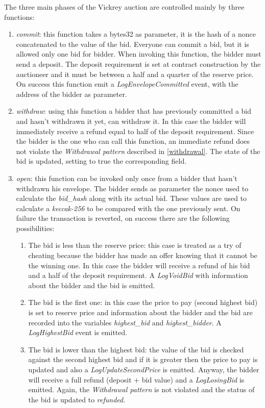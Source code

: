 \documentclass{article}
\begin{document}
The three main phases of the Vickrey auction are controlled mainly by three functions:
\begin{enumerate}
    \item \textit{commit}: this function takes a bytes32 as parameter, it is the hash of a nonce concatenated to the value of the bid. Everyone can commit a bid, but it is allowed only one bid for bidder. When invoking this function, the bidder must send a deposit. The deposit requirement is set at contract construction by the auctioneer and it must be between a half and a quarter of the reserve price. On success this function emit a \textit{LogEnvelopeCommitted} event, with the address of the bidder as parameter.
    \item \textit{withdraw}: using this function a bidder that has previously committed a bid and hasn't withdrawn it yet, can withdraw it. In this case the bidder will immediately receive a refund equal to half of the deposit requirement. Since the bidder is the one who can call this function, an immediate refund does not violate the \textit{Withdrawal pattern} described in \ref{withdrawal}. The state of the bid is updated, setting to true the corresponding field.
    \item \textit{open}: this function can be invoked only once from a bidder that hasn't withdrawn his envelope. The bidder sends as parameter the nonce used to calculate the \textit{bid\_hash} along with its actual bid. These values are used to calculate a \textit{keccak-256} to be compared with the one previously sent. On failure the transaction is reverted, on success there are the following possibilities:
    \begin{enumerate}
        \item The bid is less than the reserve price: this case is treated as a try of cheating because the bidder has made an offer knowing that it cannot be the winning one. In this case the bidder will receive a refund of his bid and a half of the deposit requirement. A \textit{LogVoidBid} with information about the bidder and the bid is emitted.
        \item The bid is the first one: in this case the price to pay (second highest bid) is set to reserve price and information about the bidder and the bid are recorded into the variables \textit{highest\_bid} and \textit{highest\_bidder}. A \textit{LogHighestBid} event is emitted.
        \item The bid is lower than the highest bid: the value of the bid is checked against the second highest bid and if it is greater then the price to pay is updated and also a \textit{LogUpdateSecondPrice} is emitted. Anyway, the bidder will receive a full refund (deposit + bid value) and a \textit{LogLosingBid} is emitted. Again, the \textit{Withdrawal pattern} is not violated and the status of the bid is updated to \textit{refunded}.

\end{enumerate}
\end{enumerate}
\end{document}
